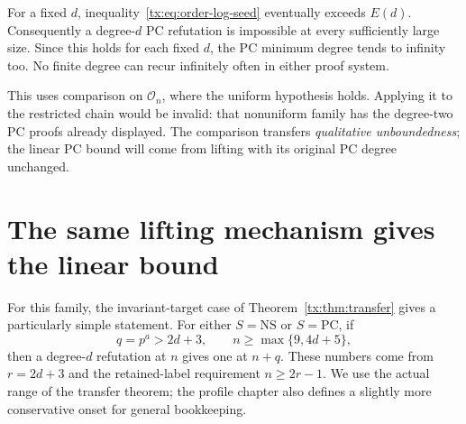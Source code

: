 \documentclass[11pt,a4paper,oneside,openany]{book}
\theoremstyle{definition}\newtheorem{definition}[theorem]{Definition}
\theoremstyle{remark}\newtheorem{remark}[theorem]{Remark}
\newcommand{\NS}{\mathrm{NS}}\newcommand{\PC}{\mathrm{PC}}
\numberwithin{equation}{chapter}
\begin{document}
For a fixed $d$, inequality~\eqref{tx:eq:order-log-seed} eventually
exceeds $E(d)$. Consequently a degree-$d$ PC refutation is impossible
at every sufficiently large size. Since this holds for each fixed
$d$, the PC minimum degree tends to infinity too. No finite degree
can recur infinitely often in either proof system.

This uses comparison on $\mathcal O_n$, where the uniform hypothesis
holds. Applying it to the restricted chain would be invalid: that
nonuniform family has the degree-two PC proofs already displayed.
The comparison transfers \emph{qualitative unboundedness}; the linear
PC bound will come from lifting with its original PC degree unchanged.

\section{The same lifting mechanism gives the linear bound}
For this family, the invariant-target case of
Theorem~\ref{tx:thm:transfer} gives a particularly simple statement.
For either $S=\NS$ or $S=\PC$, if
\begin{equation}\label{tx:eq:order-lift-range}
 q=p^a>2d+3,\qquad n\ge\max\{9,4d+5\},
\end{equation}
then a degree-$d$ refutation at $n$ gives one at $n+q$. These numbers
come from $r=2d+3$ and the retained-label requirement $n\ge2r-1$.
We use the actual range of the transfer theorem; the profile chapter
also defines a slightly more conservative onset for general bookkeeping.
\end{document}
